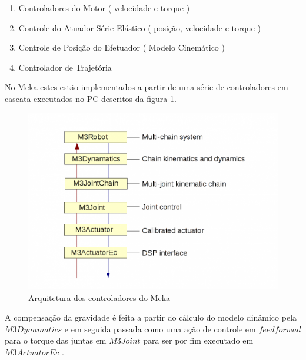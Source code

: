 \begin{enumerate}
    \item Controladores do Motor ( velocidade e torque )
    \item Controle do Atuador Série Elástico ( posição, velocidade e torque )
    \item Controle de Posição do Efetuador ( Modelo Cinemático )
    \item Controlador de Trajetória
\end{enumerate}

No Meka estes estão implementados a partir de uma série de controladores em cascata executados no PC descritos da figura \ref{fig:controlarch}.

\begin{figure}[H]
    \centering
    \includegraphics[width=0.7\linewidth]{tex/figs/controlarch.png}
    \caption{Arquitetura dos controladores do Meka \cite{mekaguide}}
    \label{fig:controlarch}
\end{figure}

A compensação da gravidade é feita a partir do cálculo do modelo dinâmico pela $M3Dynamatics$ e em seguida passada como uma ação de controle em $feedforwad$ para o torque das juntas em $M3Joint$ para ser por fim executado em $M3ActuatorEc$ \cite{mekaguide}.




